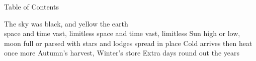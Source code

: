 {\mktsHTwo{}Table of Contents\mktsHTwoBEG}%


\vspace{\myLineheight}\begin{multicols}{2}\raggedcolumns{}\begin{mktsToc}%
{\mktsHOne{}\cjkgGlue{} The sky was black, and yellow the earth\\\cjkgGlue{} space and time vast, limitless \dotfill {}\mktsHOneBEG}%
{\mktsHTwo{}\cjkgGlue{} space and time vast, limitless \dotfill {}\mktsHTwoBEG}%
{\mktsHThree{}\cjkgGlue{} Sun high or low, moon full or parsed \dotfill {}\mktsHThreeBEG}%
{\mktsHThree{}\cjkgGlue{} with stars and lodges spread in place \dotfill {}\mktsHThreeBEG}%
{\mktsHTwo{}\cjkgGlue{} Cold arrives then heat once more \dotfill {}\mktsHTwoBEG}%
{\mktsHOne{}\cjkgGlue{} Autumn’s harvest, Winter’s store \dotfill {}\mktsHOneBEG}%
{\mktsHTwo{}\cjkgGlue{} Extra days round out the years \dotfill {}\mktsHTwoBEG}%
\end{mktsToc}%


\end{multicols}




